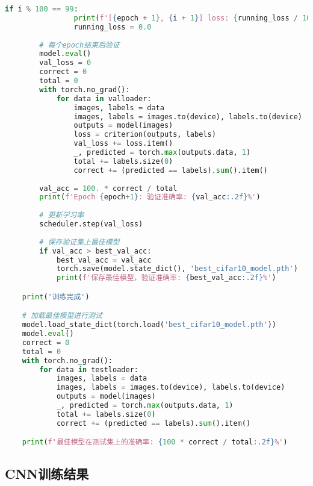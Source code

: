 \documentclass[UTF8]{report}
\theoremstyle{MyLineTheoremStyle} %
\theoremstyle{MyBlockTheoremStyle} %
\theoremstyle{MySubsubsectionStyle} %
\begin{document}
\begin{lstlisting}[language=python, caption={神经网络CNN训练（纯手写）}, label={lst:cnn_train_handwritten}]
            if i % 100 == 99:
                print(f'[{epoch + 1}, {i + 1}] loss: {running_loss / 100:.3f} | acc: {100.*correct/total:.2f}%')
                running_loss = 0.0
        
        # 每个epoch结束后验证
        model.eval()
        val_loss = 0
        correct = 0
        total = 0
        with torch.no_grad():
            for data in valloader:
                images, labels = data
                images, labels = images.to(device), labels.to(device)
                outputs = model(images)
                loss = criterion(outputs, labels)
                val_loss += loss.item()
                _, predicted = torch.max(outputs.data, 1)
                total += labels.size(0)
                correct += (predicted == labels).sum().item()
        
        val_acc = 100. * correct / total
        print(f'Epoch {epoch+1}: 验证准确率: {val_acc:.2f}%')
        
        # 更新学习率
        scheduler.step(val_loss)
        
        # 保存验证集上最佳模型
        if val_acc > best_val_acc:
            best_val_acc = val_acc
            torch.save(model.state_dict(), 'best_cifar10_model.pth')
            print(f'保存最佳模型，验证准确率: {best_val_acc:.2f}%')

    print('训练完成')

    # 加载最佳模型进行测试
    model.load_state_dict(torch.load('best_cifar10_model.pth'))
    model.eval()
    correct = 0
    total = 0
    with torch.no_grad():
        for data in testloader:
            images, labels = data
            images, labels = images.to(device), labels.to(device)
            outputs = model(images)
            _, predicted = torch.max(outputs.data, 1)
            total += labels.size(0)
            correct += (predicted == labels).sum().item()

    print(f'最佳模型在测试集上的准确率: {100 * correct / total:.2f}%')
\end{lstlisting}


\subsection{CNN训练结果}

\end{document}
